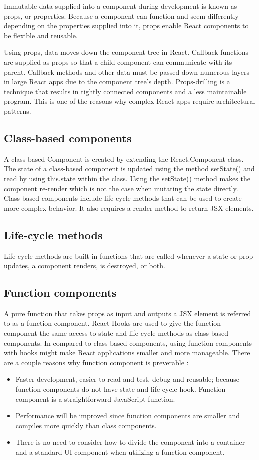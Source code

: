 Immutable data supplied into a component during development is known as props, or properties. Because a component can function and seem differently depending on the properties supplied into it, props enable React components to be flexible and reusable.

Using props, data moves down the component tree in React. Callback functions are supplied as props so that a child component can communicate with its parent. Callback methods and other data must be passed down numerous layers in large React apps due to the component tree's depth. Props-drilling is a technique that results in tightly connected components and a less maintainable program. This is one of the reasons why complex React apps require architectural patterns.

\subsection{Class-based components}
A class-based Component is created by extending the React.Component class. The state of a class-based component is updated using the method setState() and read by using this.state within the class. Using the setState() method makes the component re-render which is not the case when mutating the state directly. Class-based components include life-cycle methods that can be used to create more complex behavior. It also requires a render method to return JSX elements.

\subsection{Life-cycle methods}
Life-cycle methods are built-in functions that are called whenever a state or prop updates, a component renders, is destroyed, or both.

\subsection{Function components}
A pure function that takes props as input and outputs a JSX element is referred to as a function component. React Hooks are used to give the function component the same access to state and life-cycle methods as class-based components. In compared to class-based components, using function components with hooks might make React applications smaller and more manageable. There are a couple reasons why function component is preverable \autocite{phan2020react}:

\begin{itemize}
  \item Faster development, easier to read and test, debug and reusable; because function components do not have state and life-cycle-hook. Function component is a straightforward JavaScript function.
  \item Performance will be improved since function components are smaller and compiles more quickly than class components.
  \item There is no need to consider how to divide the component into a container and a standard UI component when utilizing a function component.
\end{itemize}

